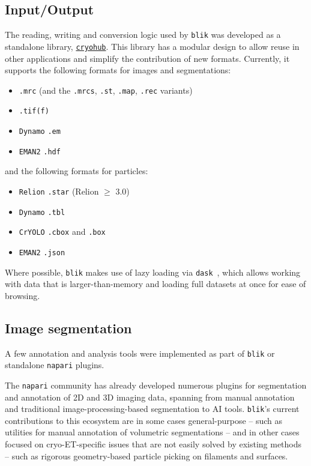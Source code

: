 \subsection{Input/Output}\label{input-output}

The reading, writing and conversion logic used by \texttt{blik} was developed as a standalone library, \href{https://github.com/teamtomo/cryohub/}{\texttt{cryohub}}. This library has a modular design to allow reuse in other applications and simplify the contribution of new formats. Currently, it supports the following formats for images and segmentations:

\begin{itemize}[noitemsep]
    \item \texttt{.mrc} (and the \texttt{.mrcs}, \texttt{.st}, \texttt{.map}, \texttt{.rec} variants) 
    \item \texttt{.tif(f)} 
    \item \texttt{Dynamo} \texttt{.em} 
    \item \texttt{EMAN2} \texttt{.hdf}
\end{itemize}  

\noindent and the following formats for particles:

\begin{itemize}[noitemsep]
    \item \texttt{Relion} \texttt{.star} (Relion $\geq$ 3.0)
    \item \texttt{Dynamo} \texttt{.tbl} 
    \item \texttt{CrYOLO} \texttt{.cbox} and \texttt{.box}
    \item \texttt{EMAN2} \texttt{.json}
\end{itemize}

Where possible, \texttt{blik} makes use of lazy loading via \texttt{dask}~\cite{daskdevelopmentteamDaskLibraryDynamic2016}, which allows working with data that is larger-than-memory and loading full datasets at once for ease of browsing.

\subsection{Image segmentation}\label{image-segmentation}

A few annotation and analysis tools were implemented as part of \texttt{blik} or standalone \texttt{napari} plugins.

The \texttt{napari} community has already developed numerous plugins for segmentation and annotation of 2D and 3D imaging data, spanning from manual annotation and traditional image-processing-based segmentation to AI tools. \texttt{blik}'s current contributions to this ecosystem are in some cases general-purpose -- such as utilities for manual annotation of volumetric segmentations -- and in other cases focused on cryo-ET-specific issues that are not easily solved by existing methods -- such as rigorous geometry-based particle picking on filaments and surfaces.

